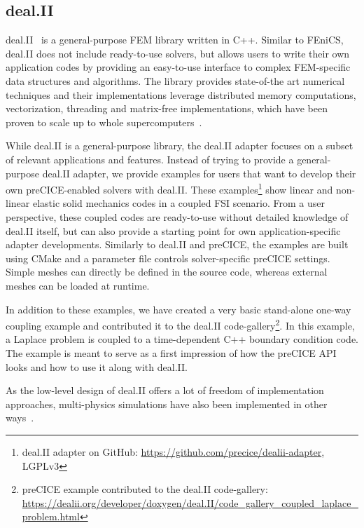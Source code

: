 \subsection{deal.II} 

deal.II~\cite{dealII92,dealii2019design} is a general-purpose FEM library written in C++. Similar to FEniCS, deal.II does not include ready-to-use solvers, but allows users to write their own application codes by providing an easy-to-use interface to complex FEM-specific data structures and algorithms. The library
provides state-of-the art numerical techniques and their implementations leverage distributed memory computations, vectorization, threading and matrix-free implementations, which have been proven to scale up to whole supercomputers~\cite{dealiiDistributed,kronbichler2018performance}.

While deal.II is a general-purpose library, the deal.II adapter focuses on a subset of relevant applications and features. Instead of trying to provide a general-purpose deal.II adapter, we provide examples for users that want to develop their own preCICE-enabled solvers with deal.II.
These examples\footnote{deal.II adapter on GitHub: \url{https://github.com/precice/dealii-adapter}, LGPLv3} show
linear and non-linear elastic solid mechanics codes in a coupled FSI scenario. From a user perspective, these coupled codes are ready-to-use without detailed knowledge of deal.II itself, but can also provide a starting point for own application-specific adapter developments.
Similarly to deal.II and preCICE, the examples are built using CMake and a parameter file controls solver-specific preCICE settings. Simple meshes can directly be defined in the source code, whereas external meshes can be loaded at runtime.

In addition to these examples, we have created a very basic stand-alone one-way coupling example and contributed it to the deal.II code-gallery\footnote{preCICE example contributed to the deal.II code-gallery:\\ \url{https://dealii.org/developer/doxygen/deal.II/code\_gallery\_coupled\_laplace\_problem.html}}. In this example, a Laplace problem is coupled to a time-dependent C++ boundary condition code. The example is meant to serve as a first impression of how the preCICE API looks and how to use it along with deal.II.

As the low-level design of deal.II offers a lot of freedom of implementation approaches, multi-physics simulations have also been implemented in other ways~\cite{ExaDG2020, wick2013}. 

